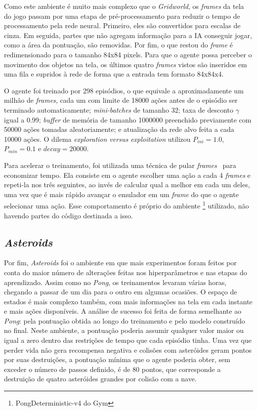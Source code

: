 Como este ambiente é muito mais complexo que o \textit{Gridworld}, os \textit{frames} da tela do jogo passam por uma etapa de pré-processamento para reduzir o tempo de processamento pela rede neural.
Primeiro, eles são convertidos para escalas de cinza.
Em seguida, partes que não agregam informação para a IA conseguir jogar, como a área da pontuação, são removidas.
Por fim, o que restou do \textit{frame} é redimensionado para o tamanho 84x84 pixels.
Para que o agente possa perceber o movimento dos objetos na tela, os últimos quatro \textit{frames} vistos são inseridos em uma fila e supridos à rede de forma que a entrada tem formato 84x84x4.

O agente foi treinado por 298 episódios, o que equivale a aproximadamente um milhão de \textit{frames}, cada um com limite de 18000 ações antes de o episódio ser terminado automaticamente;
\textit{mini-batches} de tamanho 32; taxa de desconto $\gamma$ igual a 0.99;
\textit{buffer} de memória de tamanho 1000000 preenchido previamente com 50000 ações tomadas aleatoriamente;
e atualização da rede alvo feita a cada 10000 ações.
O dilema \textit{exploration versus exploitation} utilizou $P_{ini} = 1.0$, $P_{min} = 0.1$ e $decay = 20000$.

Para acelerar o treinamento, foi utilizada uma técnica de pular \textit{frames}~\cite{DBLP:journals/corr/abs-1207-4708} para economizar tempo.
Ela consiste em o agente escolher uma ação a cada 4 \textit{frames} e repeti-la nos três seguintes, ao invés de calcular qual a melhor em cada um deles, uma vez que é mais rápido avançar o emulador em um \textit{frame} do que o agente selecionar uma ação.
Esse comportamento é próprio do ambiente \footnote{PongDeterministic-v4 do Gym} utilizado, não havendo partes do código destinada a isso.

\subsection{\textit{Asteroids}}
\label{sec:exp_asteroids}

Por fim, \textit{Asteroids} foi o ambiente em que mais experimentos foram feitos por conta do maior número de alterações feitas nos hiperparâmetros e nas etapas do aprendizado.
Assim como no \textit{Pong}, os treinamentos levaram várias horas, chegando a passar de um dia para o outro em algumas ocasiões.
O espaço de estados é mais complexo também, com mais informações na tela em cada instante e mais ações disponíveis.
A análise de sucesso foi feita de forma semelhante ao \textit{Pong}: pela pontuação obtida ao longo do treinamento e pelo modelo construído no final.
Neste ambiente, a pontuação poderia assumir qualquer valor maior ou igual a zero dentro das restrições de tempo que cada episódio tinha.
Uma vez que perder vida não gera recompensa negativa e colisões com asteróides geram pontos por suas destruições, a pontuação mínima que o agente poderia obter, sem exceder o número de passos definido, é de 80 pontos, que corresponde a destruição de quatro asteróides grandes por colisão com a nave.


